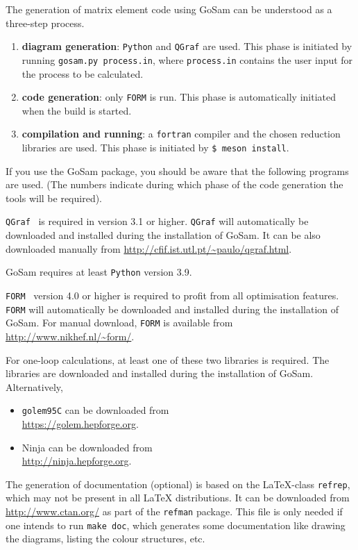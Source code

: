 \documentclass[11pt,a4paper]{refrep}
\newcommand{\gosamversion}{{3{.}0}}
\newcommand{\gosam}{{\sc GoSam}\xspace}
\newcommand{\gosamv}[1][\gosamversion]{{\sc GoSam}\xspace}
\newcommand{\golemVC}{{\tt golem95C}\xspace}
\newcommand{\qgraf}{{\tt QGraf}\xspace}
\newcommand{\form}{{\tt FORM}\xspace}
\newcommand{\python}{{\tt Python}\xspace}
\newcommand{\ninja}{{\sc Ninja}\xspace}
\begin{document}
The generation of matrix element code using \gosamv can be understood
as a three-step process. 
\begin{enumerate}
\item  {\bf diagram generation}: \python
and \qgraf are used. This phase is initiated by
running \texttt{gosam.py process.in}, where {\tt process.in} contains the 
user input for the process to be calculated.
\item {\bf code generation}: only \form is run.
This phase is automatically initiated when the build is started.
\item {\bf compilation and running}: 
a {\tt fortran} compiler and the chosen reduction libraries are used.
This phase is initiated
by  \texttt{\$ meson install}.
\end{enumerate}

If you use the \gosamv package, you should be aware that
the following programs are used.
(The numbers indicate during which phase of the code generation
the tools will be required).

\marginlabel{\qgraf (1)} \qgraf~\cite{Nogueira:1991ex}
is required in version 3{.}1 or
higher. 
\qgraf will automatically be downloaded and installed during the installation of \gosam.
It can be also downloaded manually from
\url{http://cfif.ist.utl.pt/~paulo/qgraf.html}.

\marginlabel{\python (1)} \gosam requires at least {\tt Python} version 3{.}9.

\marginlabel{\form (2)}  \form~\cite{Vermaseren:2000nd,Kuipers:2012rf}
version 4{.}0 or higher is required to profit from all optimisation features.
\form will automatically be downloaded and installed during the installation of \gosam.
For manual download, \form is available from
\url{http://www.nikhef.nl/~form/}.

\marginlabel{\ninja/\golemVC (3)}
For one-loop calculations, at least one of these two libraries is
required.
The libraries are downloaded and installed during the installation of \gosam.
Alternatively, 
\begin{itemize}
\item \golemVC can be downloaded from\\
\url{https://golem.hepforge.org}.
\item \ninja can be downloaded from\\
\url{http://ninja.hepforge.org}.
\end{itemize}

 The generation of documentation (optional)
is based on the \LaTeX-class \texttt{refrep}, which may not be
present in all \LaTeX{}
distributions. It can be downloaded from \url{http://www.ctan.org/}
as part of the \texttt{refman} package.
This file is only needed if one intends to run \texttt{make doc},
which generates some documentation like drawing the diagrams, 
listing the colour structures, etc.
\end{document}
